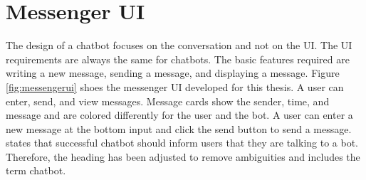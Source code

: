 \section{Messenger UI}
The design of a chatbot focuses on the conversation and not on the UI.
The UI requirements are always the same for chatbots.
The basic features required are writing a new message, sending a message, and displaying a message.
 Figure \ref{fig:messengerui} shoes the messenger UI  developed for this thesis. 
A user can enter, send, and view messages.
Message cards show the sender, time, and message and are colored differently for the user and the bot.
A user can enter a new message at the bottom input and click the send button to send a message.
\citet{brandtzaeg2018chatbots} states that successful chatbot should inform users that they are talking to a bot.
Therefore, the heading has been adjusted to remove ambiguities and includes the term chatbot.
